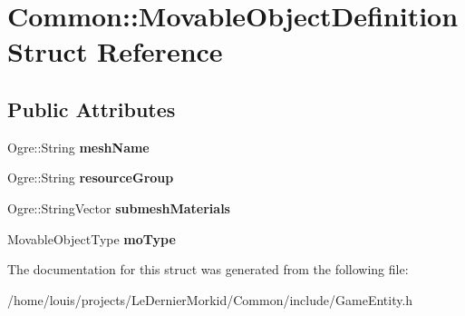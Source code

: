 \hypertarget{struct_common_1_1_movable_object_definition}{}\section{Common\+:\+:Movable\+Object\+Definition Struct Reference}
\label{struct_common_1_1_movable_object_definition}
\subsection*{Public Attributes}
\begin{DoxyCompactItemize}
\item 
\mbox{\label{struct_common_1_1_movable_object_definition_a2421cd0320f356ac07de4b53360547a6}} 
Ogre\+::\+String {\bfseries mesh\+Name}
\item 
\mbox{\label{struct_common_1_1_movable_object_definition_ac43b5c32c8357b59a94201216cd02085}} 
Ogre\+::\+String {\bfseries resource\+Group}
\item 
\mbox{\label{struct_common_1_1_movable_object_definition_ae7c8198fd708a0f8abe946f42461a691}} 
Ogre\+::\+String\+Vector {\bfseries submesh\+Materials}
\item 
\mbox{\label{struct_common_1_1_movable_object_definition_aeb4c2de96c472af36d917cc68fc9e220}} 
Movable\+Object\+Type {\bfseries mo\+Type}
\end{DoxyCompactItemize}


The documentation for this struct was generated from the following file\+:\begin{DoxyCompactItemize}
\item 
/home/louis/projects/\+Le\+Dernier\+Morkid/\+Common/include/Game\+Entity.\+h\end{DoxyCompactItemize}
